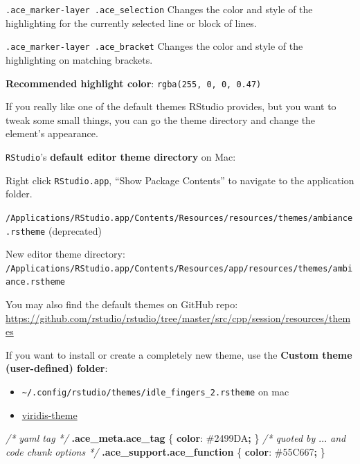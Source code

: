 \documentclass[
  a4paper,
  twoside,
  openright]{book}
\newenvironment{Shaded}{\begin{snugshade}}{\end{snugshade}}
\newcommand{\CharTok}[1]{\textcolor[rgb]{0.31,0.60,0.02}{#1}}
\newcommand{\CommentTok}[1]{\textcolor[rgb]{0.56,0.35,0.01}{\textit{#1}}}
\newcommand{\ConstantTok}[1]{\textcolor[rgb]{0.56,0.35,0.01}{#1}}
\newcommand{\FunctionTok}[1]{\textcolor[rgb]{0.13,0.29,0.53}{\textbf{#1}}}
\newcommand{\KeywordTok}[1]{\textcolor[rgb]{0.13,0.29,0.53}{\textbf{#1}}}
\newcommand{\NormalTok}[1]{#1}
\newcommand{\OperatorTok}[1]{\textcolor[rgb]{0.81,0.36,0.00}{\textbf{#1}}}
\providecommand{\tightlist}{%
  \setlength{\itemsep}{0pt}\setlength{\parskip}{0pt}}
\theoremstyle{definition}
\theoremstyle{definition}
\theoremstyle{definition}
\theoremstyle{definition}
\theoremstyle{remark}
\begin{document}
\texttt{.ace\_marker-layer\ .ace\_selection} Changes the color and style of the highlighting for the currently selected line or block of lines.

\texttt{.ace\_marker-layer\ .ace\_bracket} Changes the color and style of the highlighting on matching brackets.

\textbf{Recommended highlight color}: \texttt{rgba(255,\ 0,\ 0,\ 0.47)}

If you really like one of the default themes RStudio provides, but you want to tweak some small things, you can go the theme directory and change the element's appearance.

\texttt{RStudio}'s \textbf{default editor theme directory} on Mac:

Right click \texttt{RStudio.app}, ``Show Package Contents'' to navigate to the application folder.

\texttt{/Applications/RStudio.app/Contents/Resources/resources/themes/ambiance.rstheme} (deprecated)

New editor theme directory: \texttt{/Applications/RStudio.app/Contents/Resources/app/resources/themes/ambiance.rstheme}

You may also find the default themes on GitHub repo: \url{https://github.com/rstudio/rstudio/tree/master/src/cpp/session/resources/themes}

If you want to install or create a completely new theme, use the \textbf{Custom theme (user-defined) folder}:

\begin{itemize}
\tightlist
\item
  \texttt{\textasciitilde{}/.config/rstudio/themes/idle\_fingers\_2.rstheme} on mac
\item
  \href{https://github.com/z3tt/viridis-theme/blob/main/viridis.rstheme}{viridis-theme}
\end{itemize}

\begin{Shaded}
\begin{Highlighting}[]
\CommentTok{/* yaml tag */}
\FunctionTok{.ace\_meta.ace\_tag}\NormalTok{ \{}
  \KeywordTok{color}\CharTok{:} \ConstantTok{\#2499DA}\OperatorTok{;}
\NormalTok{\}}
\CommentTok{/* quoted by $...$ and code chunk options */}
\FunctionTok{.ace\_support.ace\_function}\NormalTok{ \{}
  \KeywordTok{color}\CharTok{:} \ConstantTok{\#55C667}\OperatorTok{;}
\NormalTok{\}}
\end{Highlighting}
\end{Shaded}
\end{document}
